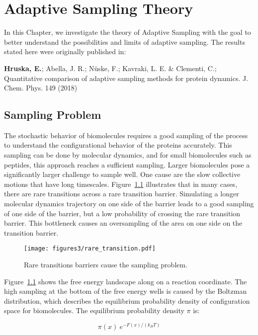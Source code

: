 \afterpage{\null\newpage}
\chapter{Adaptive Sampling Theory\label{ch:chapter3}}


In this Chapter, we investigate the theory of Adaptive Sampling with the goal to better understand the possibilities and limits of adaptive sampling. The results stated here were originally published in: 

\cite{Adstrategies2018} \textbf{Hruska, E.}; Abella, J. R.; N\"uske, F.;
Kavraki, L. E. \& Clementi, C.; Quantitative
comparison of adaptive sampling methods
for protein dynamics. J. Chem. Phys. 149 (2018) 

\section{Sampling Problem}

The stochastic behavior of biomolecules requires a good sampling of the process to understand the configurational behavior of the proteins accurately. This sampling can be done by molecular dynamics, and for small biomolecules such as peptides, this approach reaches a sufficient sampling. Larger biomolecules pose a significantly larger challenge to sample well. One cause are the slow collective motions that have long timescales. Figure~\ref{fig:raretransitions} illustrates that in many cases, there are rare transitions across a rare transition barrier. Simulating a longer molecular dynamics trajectory on one side of the barrier leads to a good sampling of one side of the barrier, but a low probability of crossing the rare transition barrier. This bottleneck causes an oversampling of the area on one side on the transition barrier.  

\begin{figure}[H]
  \centering
  \texttt{[image: figures3/rare\_transition.pdf]}
  \caption{Rare transitions barriers cause the sampling problem.}
  \label{fig:raretransitions}
\end{figure}

Figure~\ref{fig:raretransitions} shows the free energy landscape along on a reaction coordinate. The high sampling at the bottom of the free energy wells is caused by the Boltzman distribution, which describes the equilibrium probability density of configuration space for biomolecules. The equilibrium probability density $\pi$ is:

$$\pi(x)~e^{-F(x)/(k_{B}T)}$$

